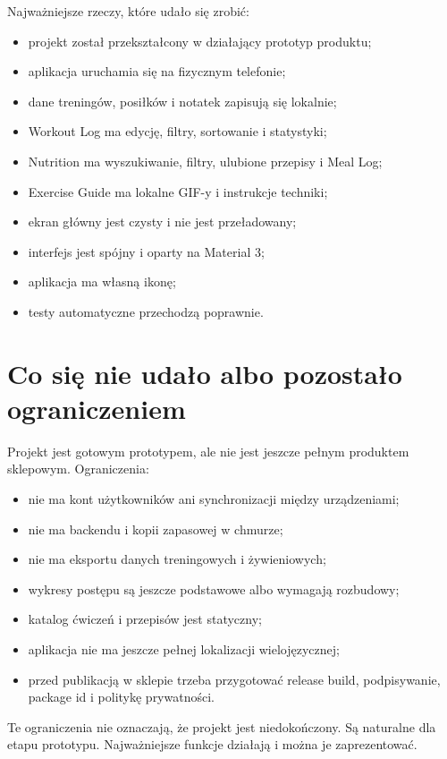 \documentclass[12pt,a4paper]{article}
\begin{document}
Najważniejsze rzeczy, które udało się zrobić:

\begin{itemize}
    \item projekt został przekształcony w działający prototyp produktu;
    \item aplikacja uruchamia się na fizycznym telefonie;
    \item dane treningów, posiłków i notatek zapisują się lokalnie;
    \item Workout Log ma edycję, filtry, sortowanie i statystyki;
    \item Nutrition ma wyszukiwanie, filtry, ulubione przepisy i Meal Log;
    \item Exercise Guide ma lokalne GIF-y i instrukcje techniki;
    \item ekran główny jest czysty i nie jest przeładowany;
    \item interfejs jest spójny i oparty na Material 3;
    \item aplikacja ma własną ikonę;
    \item testy automatyczne przechodzą poprawnie.
\end{itemize}

\section{Co się nie udało albo pozostało ograniczeniem}

Projekt jest gotowym prototypem, ale nie jest jeszcze pełnym produktem sklepowym. Ograniczenia:

\begin{itemize}
    \item nie ma kont użytkowników ani synchronizacji między urządzeniami;
    \item nie ma backendu i kopii zapasowej w chmurze;
    \item nie ma eksportu danych treningowych i żywieniowych;
    \item wykresy postępu są jeszcze podstawowe albo wymagają rozbudowy;
    \item katalog ćwiczeń i przepisów jest statyczny;
    \item aplikacja nie ma jeszcze pełnej lokalizacji wielojęzycznej;
    \item przed publikacją w sklepie trzeba przygotować release build, podpisywanie, package id i politykę prywatności.
\end{itemize}

Te ograniczenia nie oznaczają, że projekt jest niedokończony. Są naturalne dla etapu prototypu. Najważniejsze funkcje działają i można je zaprezentować.
\end{document}
